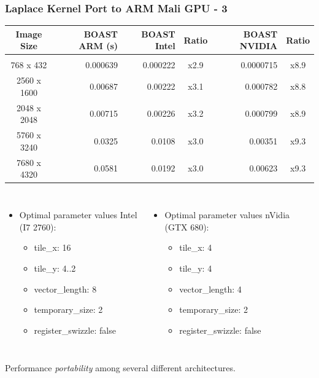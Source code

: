 \documentclass{beamer}
\begin{document}
\begin{frame}
  \frametitle{Laplace Kernel Port to ARM Mali GPU - 3}
  \begin{center}
  \scriptsize
  \begin{tabular}{c|r|r|c|r|c}
    Image Size & BOAST ARM (s) & BOAST Intel & Ratio & BOAST NVIDIA & Ratio \\
    \hline&&&&\\
  768 x 432   & 0.000639     & 0.000222    & x2.9  & 0.0000715    & x8.9  \\
  2560 x 1600 & 0.00687      & 0.00222     & x3.1  & 0.000782     & x8.8  \\
  2048 x 2048 & 0.00715      & 0.00226     & x3.2  & 0.000799     & x8.9  \\
  5760 x 3240 & 0.0325       & 0.0108      & x3.0  & 0.00351      & x9.3  \\
  7680 x 4320 & 0.0581       & 0.0192      & x3.0  & 0.00623      & x9.3
  \end{tabular}
  \end{center}

  \begin{columns}
  \begin{itemize}
    \item \footnotesize Optimal parameter values Intel\\(I7 2760):
    \begin{itemize}
      \item \scriptsize tile\_x: 16
      \item \scriptsize tile\_y: 4..2
      \item \scriptsize vector\_length: 8
      \item \scriptsize temporary\_size: 2
      \item \scriptsize register\_swizzle: false
    \end{itemize}
  \end{itemize}
  \begin{itemize}
    \item \footnotesize Optimal parameter values nVidia\\(GTX 680):
    \begin{itemize}
      \item \scriptsize tile\_x: 4
      \item \scriptsize tile\_y: 4
      \item \scriptsize vector\_length: 4
      \item \scriptsize temporary\_size: 2
      \item \scriptsize register\_swizzle: false
    \end{itemize}
  \end{itemize}
  \end{columns}
  \vspace{1cm}
  \centering Performance \emph{portability} among several different architectures.
\end{frame}
\end{document}
